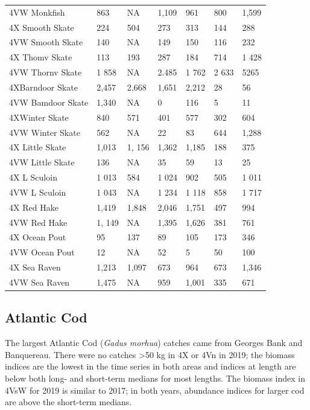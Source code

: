 \documentclass[11pt]{book}
\begin{document}
\begin{landscapepage}
\begin{longtable}[t]{lllllll}
4VW Monkfish & 863 & NA & 1,109 & 961 & 800 & 1,599\\
4X Smooth Skate & 224 & 504 & 273 & 313 & 144 & 288\\
4VW Smooth Skate & 140 & NA & 149 & 150 & 116 & 232\\
4X Thomv Skate & 113 & 193 & 287 & 184 & 714 & 1 428\\
4VW Thornv Skate & 1 858 & NA & 2.485 & 1 762 & 2 633 & 5265\\
4XBarndoor Skate & 2,457 & 2,668 & 1,651 & 2,212 & 28 & 56\\
4VW Bamdoor Skate & 1,340 & NA & 0 & 116 & 5 & 11\\
4XWinter Skate & 840 & 571 & 401 & 577 & 302 & 604\\
4VW Winter Skate & 562 & NA & 22 & 83 & 644 & 1,288\\
4X Little Skate & 1,013 & 1, 156 & 1,362 & 1,185 & 188 & 375\\
4VW Little Skate & 136 & NA & 35 & 59 & 13 & 25\\
4X L Sculoin & 1 013 & 584 & 1 024 & 902 & 505 & 1 011\\
4VW L Sculoin & 1 043 & NA & 1 234 & 1 118 & 858 & 1 717\\
4X Red Hake & 1,419 & 1,848 & 2,046 & 1,751 & 497 & 994\\
4VW Red Hake & 1, 149 & NA & 1,395 & 1,626 & 381 & 761\\
4X Ocean Pout & 95 & 137 & 89 & 105 & 173 & 346\\
4VW Ocean Pout & 12 & NA & 52 & 5 & 50 & 100\\
4X Sea Raven & 1,213 & 1,097 & 673 & 964 & 673 & 1,346\\
4VW Sea Raven & 1,475 & NA & 959 & 1,001 & 335 & 671\\*
\end{longtable}
\end{landscapepage}
\hypertarget{atlantic-cod}{%
\subsection{Atlantic Cod}\label{atlantic-cod}}

The largest Atlantic Cod (\emph{Gadus morhua}) catches came from Georges Bank and Banquereau. There were no catches \textgreater50 kg in 4X or 4Vn in 2019; the biomass indices are the lowest in the time series in both areas and indices at length are below both long- and short-term medians for most lengths. The biomass index in 4VsW for 2019 is similar to 2017; in both years, abundance indices for larger cod are above the short-term medians.
\end{document}
